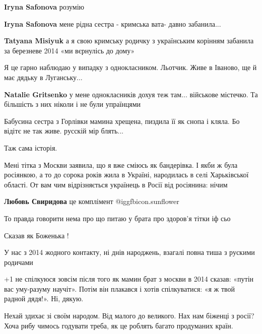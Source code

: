 \begin{itemize}
\begin{itemize} %
\textbf{Iryna Safonova} розумію

\textbf{Iryna Safonova} мене рідна сестра - кримська вата- давно забанила...

\textbf{Tatyana Misiyuk} а я свою кримську родичку з українським корінням забанила за березневе 2014 «ми вєрнулісь до дому»
\end{itemize} %


Я це гарно наблюдаю у випадку з однокласником. Льотчик. Живе в Іваново, ще й
має дядьку в Луганську...

\begin{itemize} %
\textbf{Natalie Gritsenko} у мене однокласників дохуя теж там... військове містечко. Та більшість з них ніколи і не були упраїнцями

Бабусина сестра з Горлівки мамина хрещена, пиздила її як снопа і кляла. Бо відітє не так живе. русскій мір блять...
\end{itemize} %

Таж сама історія.


Мені тітка з Москви заявила, що я вже сміюсь як бандерівка. І якби ж була
росіянкою, а то до сорока років жила в Україні, народилась в селі Харьківської
області. От вам чим відрізняється українець в Росії від росіянина: нічим


\begin{itemize} %
\textbf{Любовь Свиридова} це комплімент  @igg{fbicon.sunflower} 
\end{itemize} %

То правда говорити нема про що питаю у брата про здоров'я тітки іф сьо

Сказав як Боженька !

У нас з 2014 жодного контакту, ні днів народжень, взагалі повна тиша з рускими родичами

+1
не спілкуюся зовсім після того як мамин брат з москви в 2014 сказав: «путін вас уму-разуму научіт». Потім він плакався і хотів спілкуватися: «я ж твой радной дядя!».
Ні, дякую.


Нехай здихає зі своїм народом. Від малого до великого. Нах нам біженці з росії?
Хоча рибу чимось годувати треба, як це роблять багато продуманих країн.



\end{itemize}

